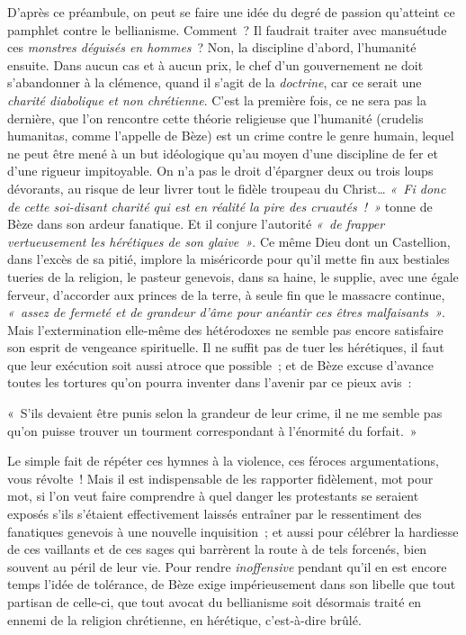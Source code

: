 \documentclass[french,twoside]{book} %
\newenvironment{quoteblock}%
  {\begin{quoting}}
  {\end{quoting}}
\newenvironment{quotebar}{%
    \def\FrameCommand{{\color{rubric!10!}\vrule width 0.5em} \hspace{0.9em}}%
    \def\OuterFrameSep{2pt} %
    \MakeFramed {\advance\hsize-\width \FrameRestore}
  }%
  {%
    \endMakeFramed
  }
\renewenvironment{quoteblock}%
  {%
    \savenotes
    \setstretch{0.9}
    \normalfont
    \begin{quotebar}
  }
  {%
    \end{quotebar}
    \spewnotes
  }
\begin{document}
\noindent D’après ce préambule, on peut se faire une idée du degré de passion qu’atteint ce pamphlet contre le bellianisme. Comment ? Il faudrait traiter avec mansuétude ces \emph{monstres déguisés en hommes} ? Non, la discipline d’abord, l’humanité ensuite. Dans aucun cas et à aucun prix, le chef d’un gouvernement ne doit s’abandonner à la clémence, quand il s’agit de la \emph{doctrine}, car ce serait une \emph{charité diabolique et non chrétienne}. C’est la première fois, ce ne sera pas la dernière, que l’on rencontre cette théorie religieuse que l’humanité (crudelis humanitas, comme l’appelle de Bèze) est un crime contre le genre humain, lequel ne peut être mené à un but idéologique qu’au moyen d’une discipline de fer et d’une rigueur impitoyable. On n’a pas le droit d’épargner deux ou trois loups dévorants, au risque de leur livrer tout le fidèle troupeau du Christ… \emph{« Fi donc de cette soi-disant charité qui est en réalité la pire des cruautés ! »} tonne de Bèze dans son ardeur fanatique. Et il conjure l’autorité \emph{« de frapper vertueusement les hérétiques de son glaive »}. Ce même Dieu dont un Castellion, dans l’excès de sa pitié, implore la miséricorde pour qu’il mette fin aux bestiales tueries de la religion, le pasteur genevois, dans sa haine, le supplie, avec une égale ferveur, d’accorder aux princes de la terre, à seule fin que le massacre continue, \emph{« assez de fermeté et de grandeur d’âme pour anéantir ces êtres malfaisants »}. Mais l’extermination elle-même des hétérodoxes ne semble pas encore satisfaire son esprit de vengeance spirituelle. Il ne suffit pas de tuer les hérétiques, il faut que leur exécution soit aussi atroce que possible ; et de Bèze excuse d’avance toutes les tortures qu’on pourra inventer dans l’avenir par ce pieux avis :\par

\begin{quoteblock}
\noindent « S’ils devaient être punis selon la grandeur de leur crime, il ne me semble pas qu’on puisse trouver un tourment correspondant à l’énormité du forfait. »\end{quoteblock}

\noindent Le simple fait de répéter ces hymnes à la violence, ces féroces argumentations, vous révolte ! Mais il est indispensable de les rapporter fidèlement, mot pour mot, si l’on veut faire comprendre à quel danger les protestants se seraient exposés s’ils s’étaient effectivement laissés entraîner par le ressentiment des fanatiques genevois à une nouvelle inquisition ; et aussi pour célébrer la hardiesse de ces vaillants et de ces sages qui barrèrent la route à de tels forcenés, bien souvent au péril de leur vie. Pour rendre \emph{inoffensive} pendant qu’il en est encore temps l’idée de tolérance, de Bèze exige impérieusement dans son libelle que tout partisan de celle-ci, que tout avocat du bellianisme soit désormais traité en ennemi de la religion chrétienne, en hérétique, c’est-à-dire brûlé.\par
\end{document}
